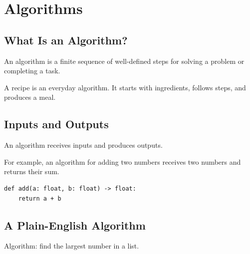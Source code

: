 \chapter{Algorithms}
\label{chap:algorithms}



\section{What Is an Algorithm?}

\begin{definition}
An algorithm is a finite sequence of well-defined steps for solving a problem or completing a task.
\end{definition}

A recipe is an everyday algorithm. It starts with ingredients, follows steps, and produces a meal.

\section{Inputs and Outputs}

An algorithm receives inputs and produces outputs.

For example, an algorithm for adding two numbers receives two numbers and returns their sum.

\begin{lstlisting}
def add(a: float, b: float) -> float:
    return a + b
\end{lstlisting}

\section{A Plain-English Algorithm}

Algorithm: find the largest number in a list.

